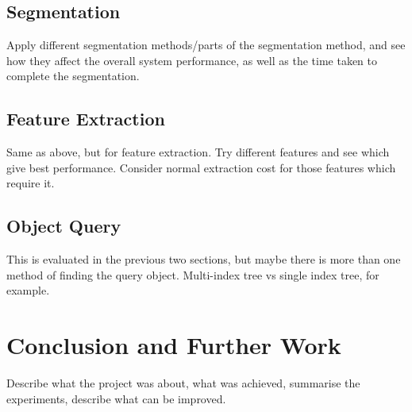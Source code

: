\documentclass[11pt,a4paper]{report}
\begin{document}
\section{Segmentation}
Apply different segmentation methods/parts of the segmentation method, and see
how they affect the overall system performance, as well as the time taken to
complete the segmentation.
\section{Feature Extraction}
Same as above, but for feature extraction. Try different features and see which
give best performance. Consider normal extraction cost for those features which
require it.
\section{Object Query}
This is evaluated in the previous two sections, but maybe there is more than one
method of finding the query object. Multi-index tree vs single index tree, for
example.
\chapter{Conclusion and Further Work}
Describe what the project was about, what was achieved, summarise the
experiments, describe what can be improved.


\end{document}
